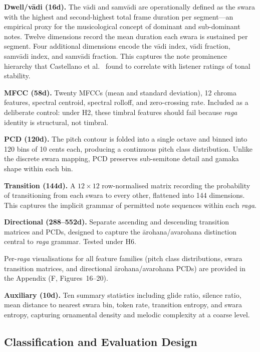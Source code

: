 \documentclass[11pt,a4paper]{article}
\begin{document}
{\textbf{Dwell/v\=adi (16d).} The v\=adi and samv\=adi are operationally defined as the swara with the highest and second-highest total frame duration per segment---an empirical proxy for the musicological concept of dominant and sub-dominant notes. Twelve dimensions record the mean duration each swara is sustained per segment. Four additional dimensions encode the v\=adi index, v\=adi fraction, samv\=adi index, and samv\=adi fraction. This captures the note prominence hierarchy that Castellano et al.~\cite{castellano1984} found to correlate with listener ratings of tonal stability.

\textbf{MFCC (58d).} Twenty MFCCs (mean and standard deviation), 12 chroma features, spectral centroid, spectral rolloff, and zero-crossing rate. Included as a deliberate control: under H2, these timbral features should fail because \textit{raga} identity is structural, not timbral.

\textbf{PCD (120d).} The pitch contour is folded into a single octave and binned into 120 bins of 10 cents each, producing a continuous pitch class distribution. Unlike the discrete swara mapping, PCD preserves sub-semitone detail and gamaka shape within each bin.

\textbf{Transition (144d).} A $12\times12$ row-normalised matrix recording the probability of transitioning from each swara to every other, flattened into 144 dimensions. This captures the implicit grammar of permitted note sequences within each \textit{raga}.

\textbf{Directional (288--552d).} Separate ascending and descending transition matrices and PCDs, designed to capture the \=arohana/avarohana distinction central to \textit{raga} grammar. Tested under H6.

\noindent Per-\textit{raga} visualisations for all feature families (pitch class distributions, swara transition matrices, and directional \=arohana/avarohana PCDs) are provided in the Appendix (F, Figures~16--20).

\textbf{Auxiliary (10d).} Ten summary statistics including glide ratio, silence ratio, mean distance to nearest swara bin, token rate, transition entropy, and swara entropy, capturing ornamental density and melodic complexity at a coarse level.

\subsection{Classification and Evaluation Design}
\label{sec:eval-design}

}
\end{document}
